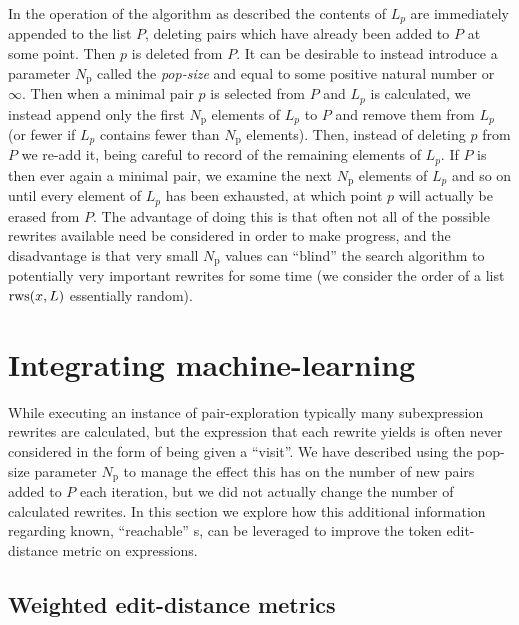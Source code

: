 \documentclass[12pt]{easychair}
\begin{document}
In the operation of the algorithm as described the contents of $L_p$ are immediately appended to the list $P$, deleting pairs which have already been added to $P$ at some point. Then $p$ is deleted from $P$. It can be desirable to instead introduce a parameter $N_\text{p}$ called the \textit{pop-size} and equal to some positive natural number or $\infty$. Then when a minimal pair $p$ is selected from $P$ and $L_p$ is calculated, we instead append only the first $N_\text{p}$ elements of $L_p$ to $P$ and remove them from $L_p$ (or fewer if $L_p$ contains fewer than $N_\text{p}$ elements). Then, instead of deleting $p$ from $P$ we re-add it, being careful to record of the remaining elements of $L_p$. If $P$ is then ever again a minimal pair, we examine the next $N_\text{p}$ elements of $L_p$ and so on until every element of $L_p$ has been exhausted, at which point $p$ will actually be erased from $P$. The advantage of doing this is that often not all of the possible rewrites available need be considered in order to make progress, and the disadvantage is that very small $N_\text{p}$ values can ``blind'' the search algorithm to potentially very important rewrites for some time (we consider the order of a list $\operatorname{rws}(x, L)$ essentially random).

\section{Integrating machine-learning}

While executing an instance of pair-exploration typically many subexpression rewrites are calculated, but the expression that each rewrite yields is often never considered in the form of being given a ``visit''. We have described using the pop-size parameter $N_\text{p}$ to manage the effect this has on the number of new pairs added to $P$ each iteration, but we did not actually change the number of calculated rewrites. In this section we explore how this additional information regarding known, ``reachable'' \expr{}s, can be leveraged to improve the token edit-distance metric on expressions.

\subsection{Weighted edit-distance metrics}
\end{document}
